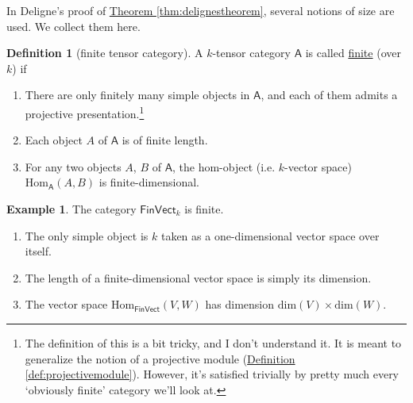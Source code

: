 \documentclass[a4paper,10pt]{scrreprt}
\newcommand{\defn}[1]{\ul{#1}}
\newcommand{\Hom}{\mathrm{Hom}}
\theoremstyle{definition}
\newtheorem{definition}{Definition}[section]
\newtheorem{example}{Example}[section]
\theoremstyle{plain}
\theoremstyle{remark}
\begin{document}
In Deligne's proof of \hyperref[thm:delignestheorem]{Theorem \ref*{thm:delignestheorem}}, several notions of size are used. We collect them here.

\begin{definition}[finite tensor category]
  \label{def:finitetensorcategory}
  A $k$-tensor category $\mathsf{A}$ is called \defn{finite} (over $k$) if 
  \begin{enumerate}
    \item There are only finitely many simple objects in $\mathsf{A}$, and each of them admits a projective presentation.\footnote{The definition of this is a bit tricky, and I don't understand it. It is meant to generalize the notion of a projective module (\hyperref[def:projectivemodule]{Definition \ref*{def:projectivemodule}}). However, it's satisfied trivially by pretty much every `obviously finite' category we'll look at.}

    \item Each object $A$ of $\mathsf{A}$ is of finite length.

    \item For any two objects $A$, $B$ of $\mathsf{A}$, the hom-object (i.e. $k$-vector space) $\Hom_{\mathsf{A}}(A, B)$ is finite-dimensional.
  \end{enumerate}
\end{definition}

\begin{example}
  The category $\mathsf{FinVect}_{k}$ is finite. 
  \begin{enumerate}
    \item The only simple object is $k$ taken as a one-dimensional vector space over itself.

    \item The length of a finite-dimensional vector space is simply its dimension.

    \item The vector space $\Hom_{\mathsf{FinVect}}(V, W)$ has dimension $\mathrm{dim}(V) \times\mathrm{dim}(W)$.
  \end{enumerate}
\end{example}
\end{document}
